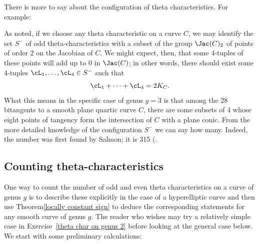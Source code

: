 
There is more to say about the configuration of theta characteristics. For example:
\begin{fact}
 As noted, if we choose any theta characteristic on a curve $C$, we may identify the set $S^-$ of odd theta-characteristics with a subset of the group $\Jac(C)_2$ of points of order 2 on the Jacobian of $C$. We might expect, then, that some 4-tuples of these points will add up to 0 in $\Jac(C)$; in other words, there should exist some 4-tuples $\cL_1,\dots,\cL_4 \in S^-$ such that
$$
\cL_1+ \dots +\cL_4 = 2K_C.
$$
What this means in the specific case of genus $g=3$ is that among the 28 bitangents to a smooth plane quartic curve $C$, there are some subsets of 4 whose eight points of tangency form the intersection of $C$ with a plane conic. From the more detailed knowledge of the configuration $S^-$ we can say how many. Indeed, the number was first found by Salmon; it is 315 (\cite{MR0115124}.
\end{fact}

\subsection{Counting theta-characteristics}\label{theta characteristic count}

One way to count the number of odd and even theta characteristics on a curve of genus $g$ is  to describe these explicitly in the case of a hyperelliptic curve and then use Theorem\ref{locally constant sign} to deduce the corresponding statements for any smooth curve of genus $g$. 
The reader who wishes may  try a relatively simple case in Exercise~\ref{theta char on genus 2} before looking at the general case below.
We start with some preliminary calculations:

